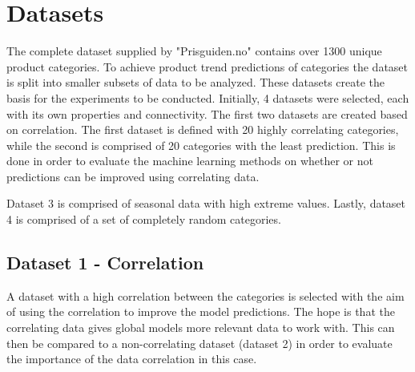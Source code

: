 \section{Datasets}
\label{section:Data:Dataset}

The complete dataset supplied by "Prisguiden.no" contains over 1300 unique product categories.
To achieve product trend predictions of categories the dataset is split into smaller subsets of data to be analyzed.
These datasets create the basis for the experiments to be conducted.
Initially, 4 datasets were selected, each with its own properties and connectivity.
The first two datasets are created based on correlation.
The first dataset is defined with 20 highly correlating categories, while the second is comprised of 20 categories with the least prediction.
This is done in order to evaluate the machine learning methods on whether or not predictions can be improved using correlating data.

Dataset 3 is comprised of seasonal data with high extreme values.
Lastly, dataset 4 is comprised of a set of completely random categories.


\subsection{Dataset 1 - Correlation}

A dataset with a high correlation between the categories is selected with the aim of using the correlation to improve the model predictions.
The hope is that the correlating data gives global models more relevant data to work with.
This can then be compared to a non-correlating dataset (dataset 2) in order to evaluate the importance of the data correlation in this case.

